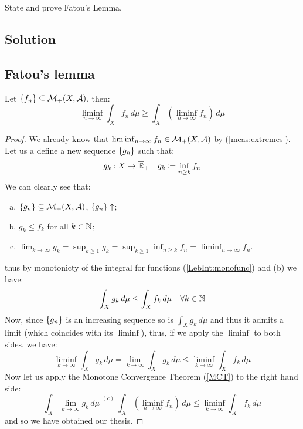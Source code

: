 
\question

State and prove Fatou's Lemma.

\subsection*{Solution}

\subsection{Fatou's lemma}\label{Fatlem}

Let $\{ f_n \} \subseteq \mathcal{M}_+(X,\mathcal{A})$, then:
\[
    \liminf_{n\to\infty} \int_X f_n \, d\mu \geq \int_X \left( \liminf_{n\to\infty} f_n \right) \, d\mu
\]

\begin{proof}
    We already know that $\liminf_{n\to\infty} f_n \in \mathcal{M}_+(X,\mathcal{A})$ by (\ref{meas:extremes}).\\
    Let us a define a new sequence $\{ g_n \}$ such that:
    \[
        g_k: X \to \overline{\mathbb{R}}_{+} \quad g_k \coloneqq \inf_{n\geq k} f_n    
    \]
    We can clearly see that:
    \begin{enumerate}[a)]
        \item $\{ g_n \} \subseteq \mathcal{M}_+(X,\mathcal{A})$, $\{ g_n \} \uparrow$;
        \item $g_k \leq f_k$ for all $k\in\mathbb{N}$;
        \item $\lim_{k\to\infty} g_k = \sup_{k\geq 1} g_k = \sup_{k\geq 1} \inf_{n\geq k} f_n = \liminf_{n\to\infty} f_n$.
    \end{enumerate}
    thus by monotonicty of the integral for functions (\ref{LebInt:monofunc}) and (b) we have:
    \[
        \int_X g_k \, d\mu \leq \int_X  f_k \, d\mu \quad \forall k\in\mathbb{N}   
    \]
    Now, since $\{ g_n \}$ is an increasing sequence so is $\int_X g_k \, d\mu$ and thus it admits a limit (which coincides with its $\liminf$), thus, if we apply the $\liminf$ to both sides, we have:
    \[
        \liminf_{k\to\infty} \int_X g_k \, d\mu = \lim_{k\to\infty} \int_X  g_k \, d\mu \leq \liminf_{k\to\infty} \int_X f_k \, d\mu 
    \]
    Now let us apply the Monotone Convergence Theorem (\ref{MCT}) to the right hand side:
    \[
        \int_X \lim_{k\to\infty} g_k \, d\mu \overset{(c)}{=} \int_X \left( \liminf_{n\to\infty} f_n \right) \, d\mu \leq \liminf_{k\to\infty} \int_X f_k \, d\mu
    \]
    and so we have obtained our thesis.
\end{proof}
